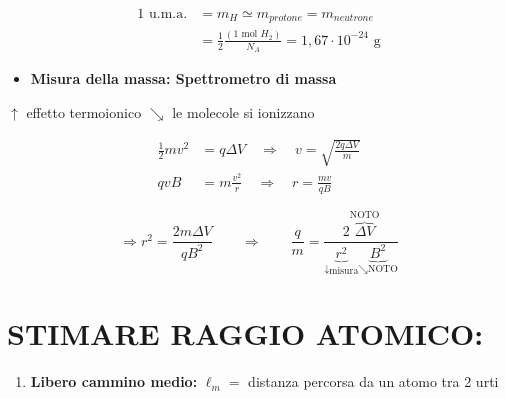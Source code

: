 \documentclass[12pt,a4paper]{article}
\begin{document}
\begin{align*}
    1 \text{ u.m.a.} &= m_H \simeq m_{protone} = m_{neutrone} \\
    &= \frac{1}{2} \frac{(1 \text{ mol } H_2)}{N_A} = 1,67 \cdot 10^{-24} \text{ g}
\end{align*}

\vspace{0.8cm}
\begin{itemize}
    \item \textbf{Misura della massa: Spettrometro di massa}
\end{itemize}


\noindent $\uparrow$ effetto termoionico \qquad $\searrow$ le molecole si ionizzano

\begin{align*}
    \frac{1}{2}mv^2 &= q \Delta V \quad \Rightarrow \quad v = \sqrt{\frac{2q\Delta V}{m}} \\
    qvB &= m\frac{v^2}{r} \quad \Rightarrow \quad r = \frac{mv}{qB}
\end{align*}

\begin{equation*}
    \Rightarrow r^2 = \frac{2m\Delta V}{qB^2} \qquad \Rightarrow \qquad \frac{q}{m} = \frac{2 \overbrace{\Delta V}^{\text{NOTO}}}{ \underbrace{r^2}_{\downarrow \text{misura}} \underbrace{B^2}_{\searrow \text{NOTO}} }
\end{equation*}

\newpage
\section*{STIMARE RAGGIO ATOMICO:}

\begin{enumerate}
    \item \textbf{Libero cammino medio:} $\ell_m =$ distanza percorsa da un atomo tra 2 urti
\end{enumerate}

\end{document}
